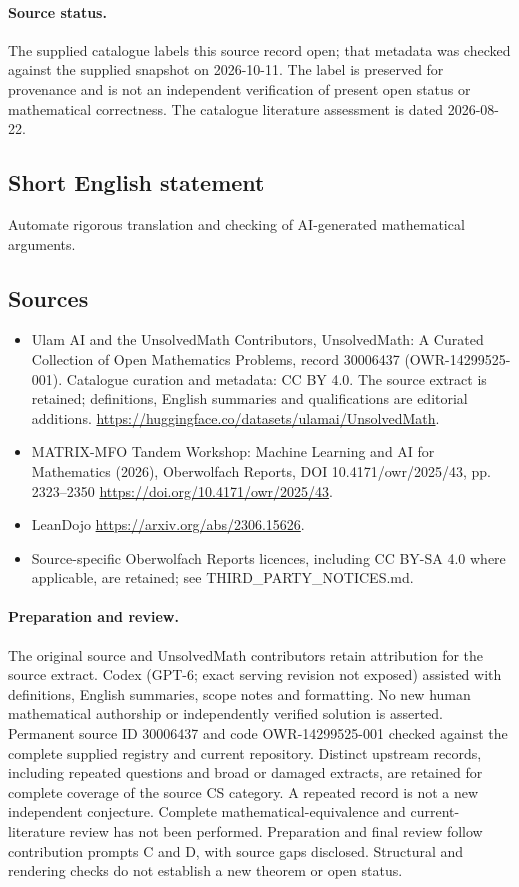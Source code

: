 \documentclass[11pt]{article}
\begin{document}
\paragraph{Source status.}
The supplied catalogue labels this source record open; that metadata was checked against the supplied snapshot on 2026-10-11. The label is preserved for provenance and is not an independent verification of present open status or mathematical correctness. The catalogue literature assessment is dated 2026-08-22.
\subsection{Short English statement}
Automate rigorous translation and checking of AI-generated mathematical arguments.
\subsection{Sources}
\begin{itemize}
\item[S1] Ulam AI and the UnsolvedMath Contributors, UnsolvedMath: A Curated Collection of Open Mathematics Problems, record 30006437 (OWR-14299525-001). Catalogue curation and metadata: CC BY 4.0. The source extract is retained; definitions, English summaries and qualifications are editorial additions.
\url{https://huggingface.co/datasets/ulamai/UnsolvedMath}.
\item[S2] MATRIX-MFO Tandem Workshop: Machine Learning and AI for Mathematics (2026), Oberwolfach Reports, DOI 10.4171/owr/2025/43, pp. 2323--2350
\url{https://doi.org/10.4171/owr/2025/43}.
\item[S3] LeanDojo
\url{https://arxiv.org/abs/2306.15626}.
\item Source-specific Oberwolfach Reports licences, including CC BY-SA 4.0 where applicable, are retained; see THIRD\_PARTY\_NOTICES.md.
\end{itemize}
\paragraph{Preparation and review.}
The original source and UnsolvedMath contributors retain attribution for the source extract. Codex (GPT-6; exact serving revision not exposed) assisted with definitions, English summaries, scope notes and formatting. No new human mathematical authorship or independently verified solution is asserted. Permanent source ID 30006437 and code OWR-14299525-001 checked against the complete supplied registry and current repository. Distinct upstream records, including repeated questions and broad or damaged extracts, are retained for complete coverage of the source CS category. A repeated record is not a new independent conjecture. Complete mathematical-equivalence and current-literature review has not been performed. Preparation and final review follow contribution prompts C and D, with source gaps disclosed. Structural and rendering checks do not establish a new theorem or open status.
\label{end:30006437}
\end{document}
